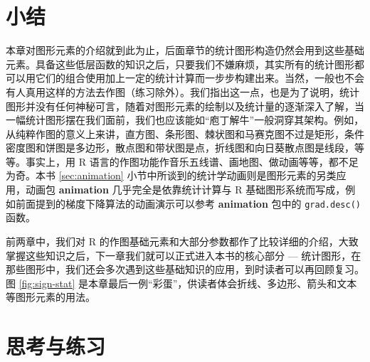 \documentclass[
  b5paper,
  UTF8,twoside]{book}
\begin{document}
\section{小结}\label{ux5c0fux7ed3}

本章对图形元素的介绍就到此为止，后面章节的统计图形构造仍然会用到这些基础元素。具备这些低层函数的知识之后，只要我们不嫌麻烦，其实所有的统计图形都可以用它们的组合使用加上一定的统计计算而一步步构建出来。当然，一般也不会有人真用这样的方法去作图（练习除外）。我们指出这一点，也是为了说明，统计图形并没有任何神秘可言，随着对图形元素的绘制以及统计量的逐渐深入了解，当一幅统计图形摆在我们面前，我们也应该能如``庖丁解牛''一般洞穿其架构。例如，从纯粹作图的意义上来讲，直方图、条形图、棘状图和马赛克图不过是矩形，条件密度图和饼图是多边形，散点图和带状图是点，折线图和向日葵散点图是线段，等等。事实上，用 R 语言的作图功能作音乐五线谱、画地图、做动画等等，都不足为奇。本书 \ref{sec:animation} 小节中所谈到的统计学动画则是图形元素的另类应用，动画包 \textbf{animation} \citep{animation} 几乎完全是依靠统计计算与 R 基础图形系统而写成，例如前面提到的梯度下降算法的动画演示可以参考 \textbf{animation} 包中的 \texttt{grad.desc()} 函数。

前两章中，我们对 R 的作图基础元素和大部分参数都作了比较详细的介绍，大致掌握这些知识之后，下一章我们就可以正式进入本书的核心部分 --- 统计图形，在那些图形中，我们还会多次遇到这些基础知识的应用，到时读者可以再回顾复习。图 \ref{fig:sign-stat} 是本章最后一例``彩蛋''，供读者体会折线、多边形、箭头和文本等图形元素的用法。

\section{思考与练习}\label{ux601dux8003ux4e0eux7ec3ux4e60-2}
\end{document}
